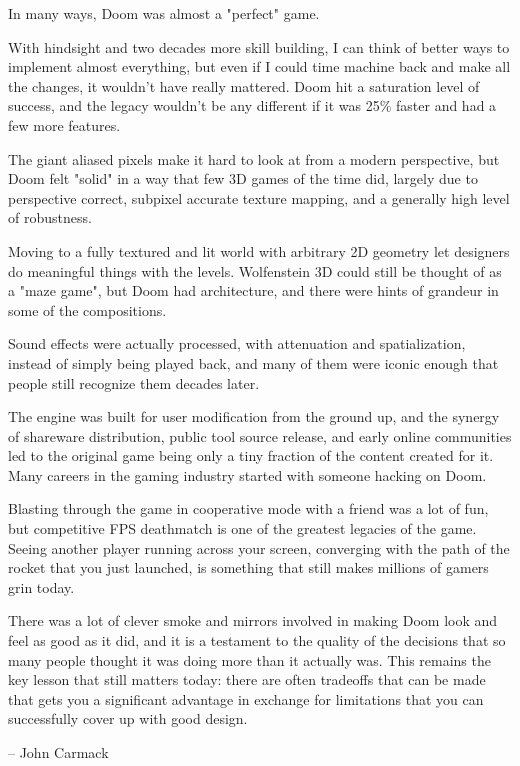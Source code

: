 
In many ways, Doom was almost a "perfect" game.\\
\par
With hindsight and two decades more skill building, I can think of better ways to implement almost everything, but even if I could time machine back and make all the changes, it wouldn't have really mattered.  Doom hit a saturation level of success, and the legacy wouldn't be any different if it was 25\% faster and had a few more features.\\
\par
 The giant aliased pixels make it hard to look at from a modern perspective, but Doom felt "solid" in a way that few 3D games of the time did, largely due to perspective correct, subpixel accurate texture mapping, and a generally high level of robustness.\\
\par
Moving to a fully textured and lit world with arbitrary 2D geometry let designers do meaningful things with the levels.  Wolfenstein 3D could still be thought of as a "maze game", but Doom had architecture, and there were hints of grandeur in some of the compositions.\\
\par
 Sound effects were actually processed, with attenuation and spatialization, instead of simply being played back, and many of them were iconic enough that people still recognize them decades later.\\
\par
 The engine was built for user modification from the ground up, and the synergy of shareware distribution, public tool source release, and early online communities led to the original game being only a tiny fraction of the content created for it.  Many careers in the gaming industry started with someone hacking on Doom.\\
\par
 Blasting through the game in cooperative mode with a friend was a lot of fun, but competitive FPS deathmatch is one of the greatest legacies of the game.  Seeing another player running across your screen, converging with the path of the rocket that you just launched, is something that still makes millions of gamers grin today.\\
\par
 There was a lot of clever smoke and mirrors involved in making Doom look and feel as good as it did, and it is a testament to the quality of the decisions that so many people thought it was doing more than it actually was.  This remains the key lesson that still matters today: there are often tradeoffs that can be made that gets you a significant advantage in exchange for limitations that you can successfully cover up with good design.\\
\par
-- John Carmack\\
\par